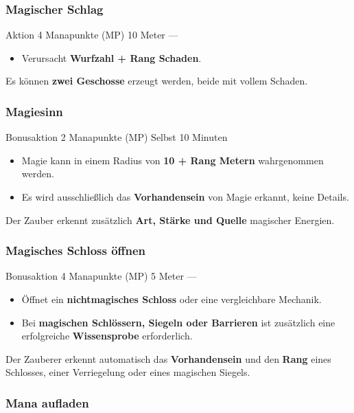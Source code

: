 \subsubsection*{Magischer Schlag}

\spellcard
{}
{Aktion}
{4 Manapunkte (MP)}
{10 Meter}
{—}
{
	\begin{itemize}
		\item Verursacht \textbf{Wurfzahl + Rang Schaden}.
	\end{itemize}
}
{
	Es können \textbf{zwei Geschosse} erzeugt werden,
	beide mit vollem Schaden.
}


\subsubsection*{Magiesinn}

\spellcard
{}
{Bonusaktion}
{2 Manapunkte (MP)}
{Selbst}
{10 Minuten}
{
	\begin{itemize}
		\item Magie kann in einem Radius von \textbf{10 + Rang Metern} wahrgenommen werden.
		\item Es wird ausschließlich das \textbf{Vorhandensein} von Magie erkannt,
		keine Details.
	\end{itemize}
}
{
	Der Zauber erkennt zusätzlich \textbf{Art, Stärke und Quelle}
	magischer Energien.
}


\subsubsection*{Magisches Schloss öffnen}

\spellcard
{}
{Bonusaktion}
{4 Manapunkte (MP)}
{5 Meter}
{—}
{
	\begin{itemize}
		\item Öffnet ein \textbf{nichtmagisches Schloss} oder eine vergleichbare Mechanik.
		\item Bei \textbf{magischen Schlössern, Siegeln oder Barrieren} ist zusätzlich
		eine erfolgreiche \textbf{Wissensprobe} erforderlich.
	\end{itemize}
}
{
	Der Zauberer erkennt automatisch das \textbf{Vorhandensein}
	und den \textbf{Rang} eines Schlosses, einer Verriegelung
	oder eines magischen Siegels.
}


\subsubsection*{Mana aufladen}

